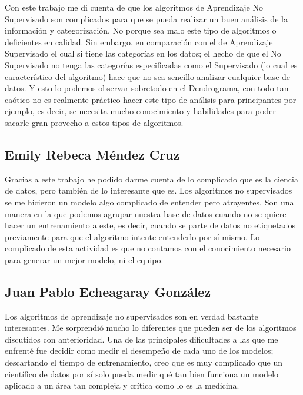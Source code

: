 \documentclass[journal]{IEEEtran}
\begin{document}
            Con este trabajo me di cuenta de que los algoritmos de Aprendizaje No Supervisado son complicados para que se pueda realizar un buen análisis de la información y categorización. No porque sea malo este tipo de algoritmos o deficientes en calidad. Sin embargo, en comparación con el de Aprendizaje Supervisado el cual si tiene las categorías en los datos; el hecho de que el No Supervisado no tenga las categorías especificadas como el Supervisado (lo cual es característico del algoritmo) hace que no sea sencillo analizar cualquier base de datos. Y esto lo podemos observar sobretodo en el Dendrograma, con todo tan caótico no es realmente práctico hacer este tipo de análisis para principantes por ejemplo, es decir, se necesita mucho conocimiento y habilidades para poder sacarle gran provecho a estos tipos de algoritmos.
        
        \subsection{Emily Rebeca Méndez Cruz}
        
            Gracias a este trabajo he podido darme cuenta de lo complicado que es la ciencia de datos, pero también de lo interesante que es. Los algoritmos no supervisados se me hicieron un modelo algo complicado de entender pero atrayentes. Son una manera en la que podemos agrupar nuestra base de datos cuando no se quiere hacer un entrenamiento a este, es decir, cuando se parte de datos no etiquetados previamente para que el algoritmo intente entenderlo por sí mismo. Lo complicado de esta actividad es que no contamos con el conocimiento necesario para generar un mejor modelo, ni el equipo.
        
        \subsection{Juan Pablo Echeagaray González}

            Los algoritmos de aprendizaje no supervisados son en verdad bastante interesantes. Me sorprendió mucho lo diferentes que pueden ser de los algoritmos discutidos con anterioridad. Una de las principales dificultades a las que me enfrenté fue decidir como medir el desempeño de cada uno de los modelos; descartando el tiempo de entrenamiento, creo que es muy complicado que un científico de datos por sí solo pueda medir qué tan bien funciona un modelo aplicado a un área tan compleja y crítica como lo es la medicina.
        
\end{document}
